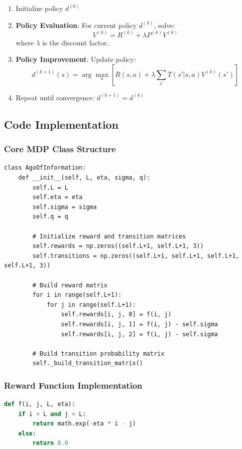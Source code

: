 \documentclass[12pt]{article}
\begin{document}
\begin{enumerate}
    \item Initialize policy $d^{(0)}$
    \item \textbf{Policy Evaluation}: For current policy $d^{(k)}$, solve:
    $$V^{(k)} = R^{(k)} + \lambda P^{(k)} V^{(k)}$$
    where $\lambda$ is the discount factor.
    
    \item \textbf{Policy Improvement}: Update policy:
    $$d^{(k+1)}(s) = \arg\max_{a} \left[ R(s, a) + \lambda \sum_{s'} T(s'|s, a) V^{(k)}(s') \right]$$
    
    \item Repeat until convergence: $d^{(k+1)} = d^{(k)}$
\end{enumerate}

\subsection{Code Implementation}

\subsubsection{Core MDP Class Structure}
\begin{lstlisting}[caption=Core MDP Class Structure]
class AgoOfInformation:
    def __init__(self, L, eta, sigma, q):
        self.L = L
        self.eta = eta
        self.sigma = sigma
        self.q = q
        
        # Initialize reward and transition matrices
        self.rewards = np.zeros((self.L+1, self.L+1, 3))
        self.transitions = np.zeros((self.L+1, self.L+1, self.L+1, self.L+1, 3))
        
        # Build reward matrix
        for i in range(self.L+1):
            for j in range(self.L+1):
                self.rewards[i, j, 0] = f(i, j)
                self.rewards[i, j, 1] = f(i, j) - self.sigma
                self.rewards[i, j, 2] = f(i, j) - self.sigma
        
        # Build transition probability matrix
        self._build_transition_matrix()
\end{lstlisting}

\subsubsection{Reward Function Implementation}
\begin{lstlisting}[language=Python, caption={Reward Function \texttt{f(i, j)}}]
def f(i, j, L, eta):
    if i < L and j < L:
        return math.exp(-eta * i - j)
    else:
        return 0.0
\end{lstlisting}
\end{document}
